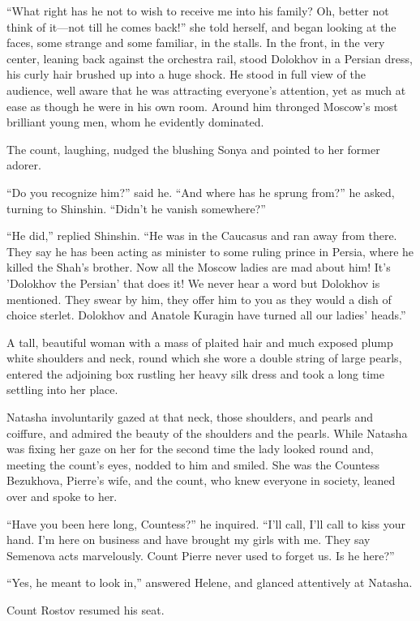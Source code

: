 ``What right has he not to wish to receive me into his family?
Oh, better not think of it---not till he comes back!'' she told
herself, and began looking at the faces, some strange and some
familiar, in the stalls. In the front, in the very center,
leaning back against the orchestra rail, stood Dolokhov in a
Persian dress, his curly hair brushed up into a huge shock. He
stood in full view of the audience, well aware that he was
attracting everyone's attention, yet as much at ease as though he
were in his own room. Around him thronged Moscow's most brilliant
young men, whom he evidently dominated.

The count, laughing, nudged the blushing Sonya and pointed to her
former adorer.

``Do you recognize him?'' said he. ``And where has he sprung
from?'' he asked, turning to Shinshin. ``Didn't he vanish
somewhere?''

``He did,'' replied Shinshin. ``He was in the Caucasus and ran
away from there. They say he has been acting as minister to some
ruling prince in Persia, where he killed the Shah's brother. Now
all the Moscow ladies are mad about him! It's 'Dolokhov the
Persian' that does it! We never hear a word but Dolokhov is
mentioned. They swear by him, they offer him to you as they would
a dish of choice sterlet. Dolokhov and Anatole Kuragin have
turned all our ladies' heads.''

A tall, beautiful woman with a mass of plaited hair and much
exposed plump white shoulders and neck, round which she wore a
double string of large pearls, entered the adjoining box rustling
her heavy silk dress and took a long time settling into her
place.

Natasha involuntarily gazed at that neck, those shoulders, and
pearls and coiffure, and admired the beauty of the shoulders and
the pearls.  While Natasha was fixing her gaze on her for the
second time the lady looked round and, meeting the count's eyes,
nodded to him and smiled.  She was the Countess Bezukhova,
Pierre's wife, and the count, who knew everyone in society,
leaned over and spoke to her.

``Have you been here long, Countess?'' he inquired. ``I'll call,
I'll call to kiss your hand. I'm here on business and have
brought my girls with me. They say Semenova acts
marvelously. Count Pierre never used to forget us. Is he here?''

``Yes, he meant to look in,'' answered Helene, and glanced
attentively at Natasha.

Count Rostov resumed his seat.

